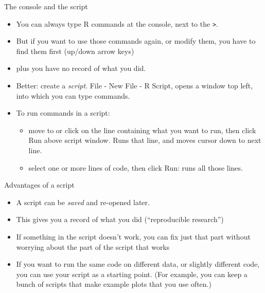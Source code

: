 \documentclass[unknownkeysallowed]{beamer}\usepackage[]{graphicx}\usepackage[]{color}
\begin{document}
\begin{frame}[fragile]{The console and the script}
  
  \begin{itemize}
  \item You can always type R commands at the console, next to the
    \texttt{>}.
  \item But if you want to use those commands again, or modify them,
    you have to find them first (up/down arrow keys)
  \item plus you have no record of what you did.
  \item Better: create a \emph{script}. File - New File - R Script,
    opens a window top left, into which you can type commands.
  \item To run commands in a script:
    \begin{itemize}
    \item move to or click on the line containing what you want to
      run, then click Run above script window. Runs that line, and
      moves cursor down to next line.
    \item select one or more lines of code, then click Run: runs all
      those lines.
    \end{itemize}
  \end{itemize}
  
\end{frame}

\begin{frame}[fragile]{Advantages of a script}
  
  \begin{itemize}
  \item A script can be \emph{saved} and re-opened later.
  \item This gives you a record of what you did (``reproducible
    research'') 
  \item If something in the script doesn't work, you can fix just
    that part without worrying about the part of the script that works
  \item If you want to run the same code on different data, or
    slightly different code, you can use your script as a starting
    point. (For example, you can keep a bunch of scripts that make
    example plots that you use often.)
  \end{itemize}
  
\end{frame}
\end{document}
